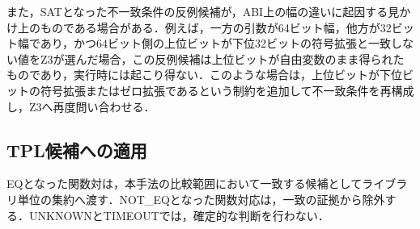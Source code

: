 また，SATとなった不一致条件の反例候補が，ABI上の幅の違いに起因する見かけ上のものである場合がある．例えば，一方の引数が64ビット幅，他方が32ビット幅であり，かつ64ビット側の上位ビットが下位32ビットの符号拡張と一致しない値をZ3が選んだ場合，この反例候補は上位ビットが自由変数のまま得られたものであり，実行時には起こり得ない．このような場合は，上位ビットが下位ビットの符号拡張またはゼロ拡張であるという制約を追加して不一致条件を再構成し，Z3へ再度問い合わせる．

\subsection{TPL候補への適用}
EQとなった関数対は，本手法の比較範囲において一致する候補としてライブラリ単位の集約へ渡す．NOT\_EQとなった関数対応は，一致の証拠から除外する．UNKNOWNとTIMEOUTでは，確定的な判断を行わない．
